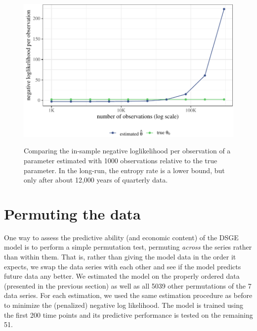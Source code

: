 \documentclass[11pt]{article}
\begin{document}
\begin{figure}[t]

{\centering \includegraphics{gfx/entropy-investigation-1} }

\caption{Comparing the in-sample negative loglikelihood per observation of a parameter estimated with 1000 observations relative to the true parameter. In the long-run, the entropy rate is a lower bound, but only after about 12,000 years of quarterly data.}\label{fig:entropy-investigation}
\end{figure}


\hypertarget{sec:permutation-summary}{%
\section{Permuting the data}\label{sec:permutation-summary}}

\label{sec:permutation-summary}

One way to assess the predictive ability (and economic content) of the
\citet{SmetsWouters2007} DSGE model is to perform a simple permutation
test, permuting \emph{across} the series rather than within them. That
is, rather than giving the model data in the order it expects, we swap
the data series with each other and see if the model predicts future
data any better. We estimated the model on the properly ordered data
(presented in the previous section) as well as all 5039 other
permutations of the 7 data series. For each estimation, we used the same
estimation procedure as before to minimize the (penalized) negative log
likelihood. The model is trained using the first 200 time points and its
predictive performance is tested on the remaining 51.
\end{document}
